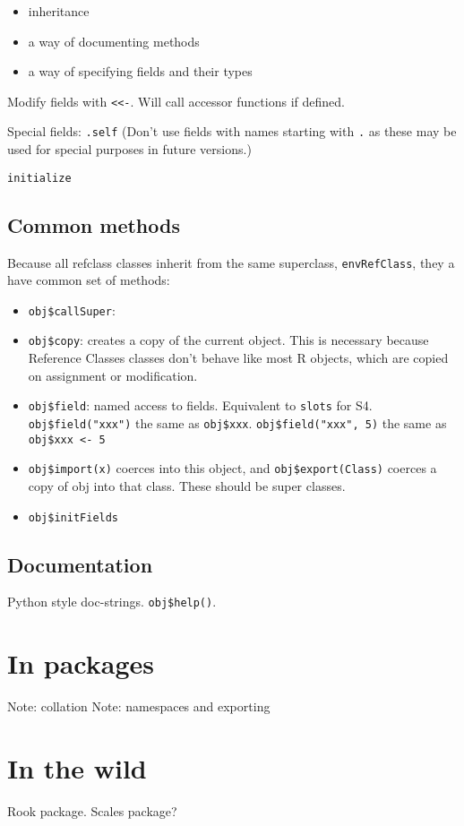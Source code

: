 \begin{itemize}
\itemsep1pt\parskip0pt
\item
  inheritance
\item
  a way of documenting methods
\item
  a way of specifying fields and their types
\end{itemize}

Modify fields with \texttt{\textless{}\textless{}-}. Will call accessor
functions if defined.

Special fields: \texttt{.self} (Don't use fields with names starting
with \texttt{.} as these may be used for special purposes in future
versions.)

\texttt{initialize}

\subsection{Common methods}

Because all refclass classes inherit from the same superclass,
\texttt{envRefClass}, they a have common set of methods:

\begin{itemize}
\item
  \texttt{obj\$callSuper}:
\item
  \texttt{obj\$copy}: creates a copy of the current object. This is
  necessary because Reference Classes classes don't behave like most R
  objects, which are copied on assignment or modification.
\item
  \texttt{obj\$field}: named access to fields. Equivalent to
  \texttt{slots} for S4. \texttt{obj\$field("xxx")} the same as
  \texttt{obj\$xxx}. \texttt{obj\$field("xxx", 5)} the same as
  \texttt{obj\$xxx \textless{}- 5}
\item
  \texttt{obj\$import(x)} coerces into this object, and
  \texttt{obj\$export(Class)} coerces a copy of obj into that class.
  These should be super classes.
\item
  \texttt{obj\$initFields}
\end{itemize}

\subsection{Documentation}

Python style doc-strings. \texttt{obj\$help()}.

\section{In packages}

Note: collation Note: namespaces and exporting

\section{In the wild}

Rook package. Scales package?
